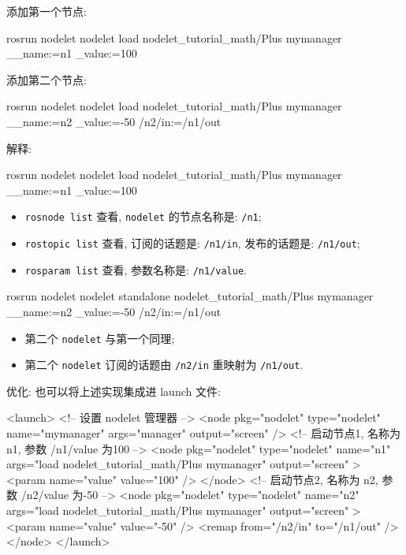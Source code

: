 \documentclass[openany, fontset=windowsold]{ctexbook}
\theoremstyle{kaiti}
\theoremstyle{normal}
\begin{document}
添加第一个节点:

\begin{bash}
  rosrun nodelet nodelet load nodelet_tutorial_math/Plus mymanager __name:=n1 _value:=100
\end{bash}

添加第二个节点:

\begin{bash}
  rosrun nodelet nodelet load nodelet_tutorial_math/Plus mymanager __name:=n2 _value:=-50 /n2/in:=/n1/out
\end{bash}

解释:

\begin{bash}
  rosrun nodelet nodelet load nodelet_tutorial_math/Plus mymanager __name:=n1 _value:=100
\end{bash}

\begin{itemize}
  \item \verb|rosnode list| 查看, \verb|nodelet| 的节点名称是: \verb|/n1|;
  \item \verb|rostopic list| 查看, 订阅的话题是: \verb|/n1/in|, 发布的话题是: \verb|/n1/out|;
  \item \verb|rosparam list| 查看, 参数名称是: \verb|/n1/value|.
\end{itemize}

\begin{bash}
  rosrun nodelet nodelet standalone nodelet_tutorial_math/Plus mymanager __name:=n2 _value:=-50 /n2/in:=/n1/out
\end{bash}

\begin{itemize}
  \item 第二个 \verb|nodelet| 与第一个同理; 
  \item 第二个 \verb|nodelet| 订阅的话题由 \verb|/n2/in| 重映射为 \verb|/n1/out|.
\end{itemize}

优化: 也可以将上述实现集成进 launch 文件:

\begin{xml}
  <launch>
      <!-- 设置 nodelet 管理器 -->
      <node pkg="nodelet" type="nodelet" name="mymanager" args="manager" output="screen" />
      <!-- 启动节点1, 名称为 n1, 参数 /n1/value 为100 -->
      <node pkg="nodelet" type="nodelet" name="n1" args="load nodelet_tutorial_math/Plus mymanager" output="screen" >
          <param name="value" value="100" />
      </node>
      <!-- 启动节点2, 名称为 n2, 参数 /n2/value 为-50 -->
      <node pkg="nodelet" type="nodelet" name="n2" args="load nodelet_tutorial_math/Plus mymanager" output="screen" >
          <param name="value" value="-50" />
          <remap from="/n2/in" to="/n1/out" />
      </node>
  </launch>
\end{xml}
\end{document}
